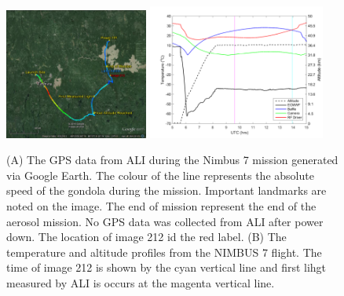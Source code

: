 \documentclass[12pt]{article}
\begin{document}
\begin{figure}
    \begin{subfigure}[t]{0\textwidth}
        \label{fig:5.1:nimbus7FlightPath:a}
    \end{subfigure}
    \begin{subfigure}[t]{0\textwidth}
         \label{fig:5.1:nimbus7FlightPath:b}
    \end{subfigure}
    \includegraphics[width=0.42\textwidth]{./Images/5-1-AliGpsDataGoogleMaps.jpg}
    \includegraphics[width=0.52\textwidth]{./Images/5-1-FlightTemperatures.pdf}
    \caption{(A) The GPS data from ALI during the Nimbus 7 mission generated via Google Earth. The colour of the line represents the absolute speed of the gondola during the
mission. Important landmarks are noted on the image. The end of mission represent the end of the aerosol mission. No GPS data was collected from ALI after power down. The location of image 212 id the red label. (B) The temperature and altitude profiles from the NIMBUS 7 flight. The time of image 212 is shown by the cyan vertical line and first lihgt measured by ALI is occurs at the magenta vertical line.}
    \label{fig:5.1:nimbus7FlightPath}
\end{figure}

\clearpage
\end{document}
